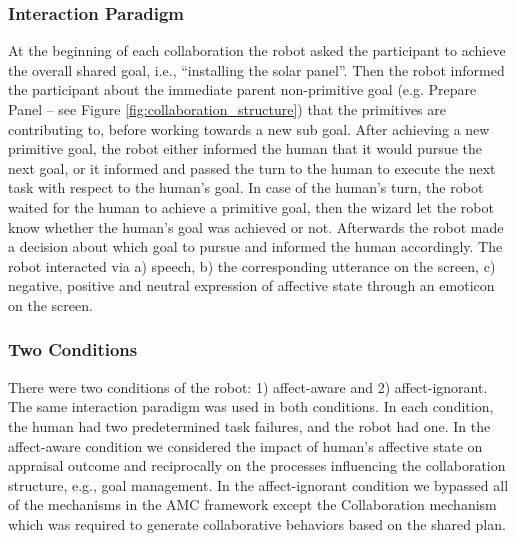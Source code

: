 \documentclass[12pt]{report}
\begin{document}
\subsubsection{Interaction Paradigm}
\label{sec-interaction-paradigms}
At the beginning of each collaboration the robot asked the participant to
achieve the overall shared goal, i.e., ``installing the solar panel''. Then the
robot informed the participant about the immediate parent non-primitive goal
(e.g. Prepare Panel -- see Figure \ref{fig:collaboration_structure}) that the
primitives are contributing to, before working towards a new sub goal. After
achieving a new primitive goal, the robot either informed the human that it
would pursue the next goal, or it informed and passed the turn to the human to
execute the next task with respect to the human's goal. In case of the human's
turn, the robot waited for the human to achieve a primitive goal, then the
wizard let the robot know whether the human's goal was achieved or not.
Afterwards the robot made a decision about which goal to pursue and informed the
human accordingly. The robot interacted via a) speech, b) the corresponding
utterance on the screen, c) negative, positive and neutral expression of
affective state through an emoticon on the screen. 

\subsubsection{Two Conditions}
There were two conditions of the robot: 1) affect-aware and 2) affect-ignorant.
The same interaction paradigm was used in both conditions. In each condition,
the human had two predetermined task failures, and the robot had one. In the
affect-aware condition we considered the impact of human's affective state on
appraisal outcome and reciprocally on the processes influencing the
collaboration structure, e.g., goal management. In the affect-ignorant condition
we bypassed all of the mechanisms in the AMC framework except the Collaboration
mechanism which was required to generate collaborative behaviors based on the
shared plan.
\end{document}
